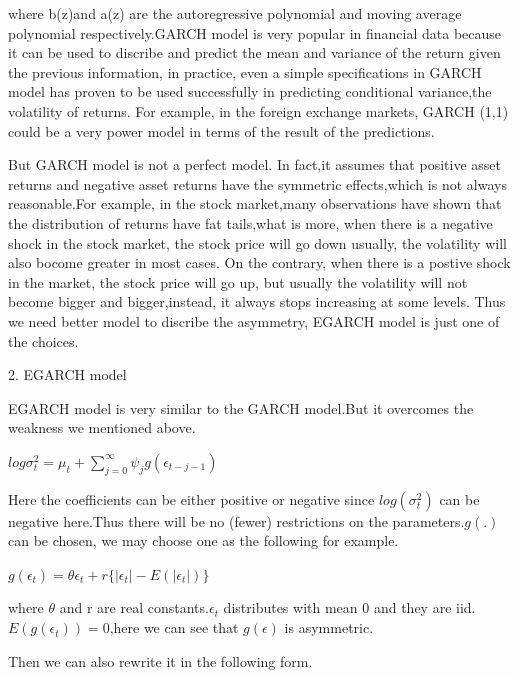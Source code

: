 \documentclass[10pt,a4paper]{article}
\begin{document}
where b(z)and a(z) are the autoregressive polynomial and moving average polynomial respectively.GARCH model is very popular in financial data because it can be used to discribe and predict the mean and variance of the return given the previous information, in practice, even a simple specifications in GARCH model has proven to be used successfully in predicting conditional variance,the volatility of returns. For example, in the foreign exchange markets, GARCH (1,1) could be a very power model in terms of the result of the predictions.

  But GARCH model is not a perfect model. In fact,it assumes that positive asset returns and negative asset returns have the symmetric effects,which is not always reasonable.For example, in the stock market,many observations have shown that the distribution of returns have fat tails,what is more, when there is a negative shock in the stock market, the stock price will go down usually, the volatility will also bocome greater in most cases. On the contrary, when there is a postive shock in the market, the stock price will go up, but usually the volatility will not become bigger and bigger,instead, it always stops increasing at some levels. Thus we need better model to discribe the asymmetry, EGARCH model is just one of the choices.

\vspace{0.5cm}

2. EGARCH model

 EGARCH model is very similar to the GARCH model.But it overcomes the weakness we mentioned above. 

\begin{center}$\displaystyle log\sigma^2_t=\mu_t+\sum_{j=0}^{\infty}\psi_j g(\epsilon_{t-j-1}) $\end{center}

Here the coefficients can be either positive or negative since $log(\sigma^2_t)$ can be negative here.Thus there will be no (fewer) restrictions on the parameters.$g(.)$ can be chosen, we may choose one as the following for example.
 
\begin{center}$\displaystyle g(\epsilon_t)=\theta\epsilon_t+r\{|\epsilon_t|-E(|\epsilon_t|)\}$\end{center} where $\theta$ and r are real constants.$\epsilon_t$ distributes with mean 0 and they are iid.$E(g(\epsilon_t))=0$,here we can see that $g(\epsilon)$ is asymmetric. 

Then we can also rewrite it in the following form.
\end{document}
